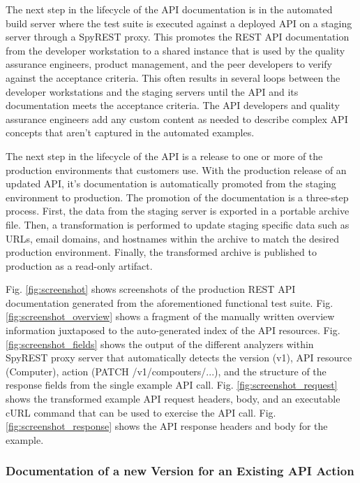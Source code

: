 \documentclass[10pt, conference]{IEEEtran}
\begin{document}
The next step in the lifecycle of the API documentation is in the automated build server where the test suite is executed against a deployed API on a staging server through a SpyREST proxy. This promotes the REST API documentation from the developer workstation to a shared instance that is used by the quality assurance engineers, product management, and the peer developers to verify against the acceptance criteria. This often results in several loops between the developer workstations and the staging servers until the API and its documentation meets the acceptance criteria. The API developers and quality assurance engineers add any custom content as needed to describe complex API concepts that aren't captured in the automated examples.

The next step in the lifecycle of the API is a release to one or more of the production environments that customers use. With the production release of an updated API, it's documentation is automatically promoted from the staging environment to production. The promotion of the documentation is a three-step process. First, the data from the staging server is exported in a portable archive file. Then, a transformation is performed to update staging specific data such as URLs, email domains, and hostnames within the archive to match the desired production environment. Finally, the transformed archive is published to production as a read-only artifact.

Fig. \ref{fig:screenshot} shows screenshots of the production REST API documentation generated from the aforementioned functional test suite. Fig. \ref{fig:screenshot_overview} shows a fragment of the manually written overview information juxtaposed to the auto-generated index of the API resources. Fig. \ref{fig:screenshot_fields} shows the output of the different analyzers within SpyREST proxy server that automatically detects the version (v1), API resource (Computer), action (PATCH /v1/compouters/...), and the structure of the response fields from the single example API call. Fig. \ref{fig:screenshot_request} shows the transformed example API request headers, body, and an executable cURL command that can be used to exercise the API call. Fig. \ref{fig:screenshot_response} shows the API response headers and body for the example.

\subsubsection{Documentation of a new Version for an Existing API Action}
\end{document}
